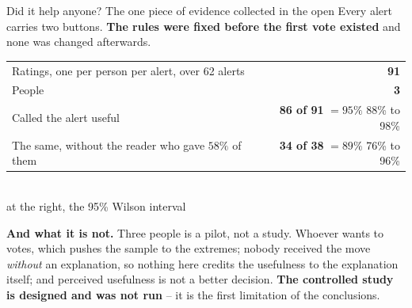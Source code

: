 \documentclass[aspectratio=169]{beamer}
\begin{document}
\begin{frame}{Did it help anyone? The one piece of evidence collected in the open}
Every alert carries two buttons. \textbf{The rules were fixed before the first vote existed}
and none was changed afterwards.
\vspace{2mm}
\begin{center}
\begin{tabular}{@{}lr@{}}
\toprule
Ratings, one per person per alert, over 62 alerts & \textbf{91} \\
People & \textbf{3} \\
\midrule
Called the alert useful & \textbf{86 of 91} $= 95\%$ \; {\scriptsize 88\% to 98\%} \\
The same, without the reader who gave $58\%$ of them & \textbf{34 of 38} $= 89\%$ \; {\scriptsize 76\% to 96\%} \\
\bottomrule
\end{tabular}
\\[1mm]
{\scriptsize at the right, the 95\% Wilson interval}
\end{center}
\vspace{1.5mm}
{\footnotesize \textbf{And what it is not.} Three people is a pilot, not a study. Whoever wants
to votes, which pushes the sample to the extremes; nobody received the move \emph{without} an
explanation, so nothing here credits the usefulness to the explanation itself; and perceived
usefulness is not a better decision. \textbf{The controlled study is designed and was not run} --
it is the first limitation of the conclusions.}
\end{frame}
\end{document}
